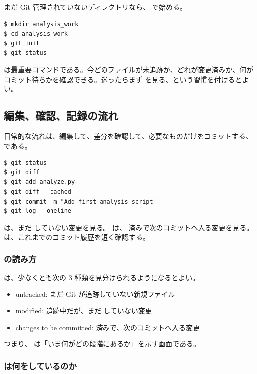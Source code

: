 まだ Git 管理されていないディレクトリなら、 で始める。

\begin{lstlisting}[numbers=none, xleftmargin=2\zw]
$ mkdir analysis_work
$ cd analysis_work
$ git init
$ git status
\end{lstlisting}

 は最重要コマンドである。今どのファイルが未追跡か、どれが変更済みか、何がコミット待ちかを確認できる。迷ったらまず  を見る、という習慣を付けるとよい。

\subsection{編集、確認、記録の流れ}

日常的な流れは、編集して、差分を確認して、必要なものだけをコミットする、である。

\begin{lstlisting}[numbers=none, xleftmargin=2\zw]
$ git status
$ git diff
$ git add analyze.py
$ git diff --cached
$ git commit -m "Add first analysis script"
$ git log --oneline
\end{lstlisting}

 は、まだ  していない変更を見る。 は、 済みで次のコミットへ入る変更を見る。 は、これまでのコミット履歴を短く確認する。

\subsubsection{ の読み方}

 は、少なくとも次の 3 種類を見分けられるようになるとよい。

\begin{itemize}
\item untracked: まだ Git が追跡していない新規ファイル
\item modified: 追跡中だが、まだ  していない変更
\item changes to be committed:  済みで、次のコミットへ入る変更
\end{itemize}

つまり、 は「いま何がどの段階にあるか」を示す画面である。

\subsubsection{ は何をしているのか}

